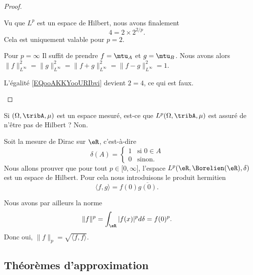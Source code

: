 \begin{proof}
\begin{subproof}
    Vu que \( L^p\) est un espace de Hilbert, nous avons finalement 
    \begin{equation}
        4=2\times 2^{2/p}.
    \end{equation}
    Cela est uniquement valable pour \( p=2\).
\item[Pour \( p=\infty\)]
    Il suffit de prendre \( f=\mtu_A\) et \( g=\mtu_B\). Nous avons alors \(  \| f \|_{L^{\infty}}^2= \| g \|_{L^{\infty}}^2  =  \| f+g \|_{L^{\infty}}^2=\| f-g \|_{L^{\infty}}^2=1\).

    L'égalité \eqref{EQooAKKYooURIbvi} devient \( 2=4\), ce qui est faux.
    \end{subproof}
\end{proof}

Si \( (\Omega,\tribA,\mu)\) est un espace mesuré, est-ce que \( L^p(\Omega,\tribA,\mu)\) est assuré de n'être pas de Hilbert ? Non.

\begin{example}
    Soit la mesure de Dirac sur \( \eR\), c'est-à-dire
    \begin{equation}
        \delta(A)=\begin{cases}
            1    &   \text{si } 0\in A\\
            0    &    \text{sinon. }
        \end{cases}
    \end{equation}
    Nous allons prouver que pour tout \( p\in \mathopen[ 0 , \infty \mathclose]\), l'espace \( L^p(\eR,\Borelien(\eR),\delta)\) est un espace de Hilbert. Pour cela nous introduisons le produit hermitien
    \begin{equation}
        \langle f, g\rangle =f(0)\overline{ g(0) }.
    \end{equation}
    
    Nous avons par ailleurs la norme
    \begin{equation}
        \| f \|^p=\int_{\eR}| f(x) |^pd\delta=f(0)^p.
    \end{equation}
    Donc oui, \( \| f \|_p=\sqrt{ \langle f, f\rangle  }\).
\end{example}

\subsection{Théorèmes d'approximation}

